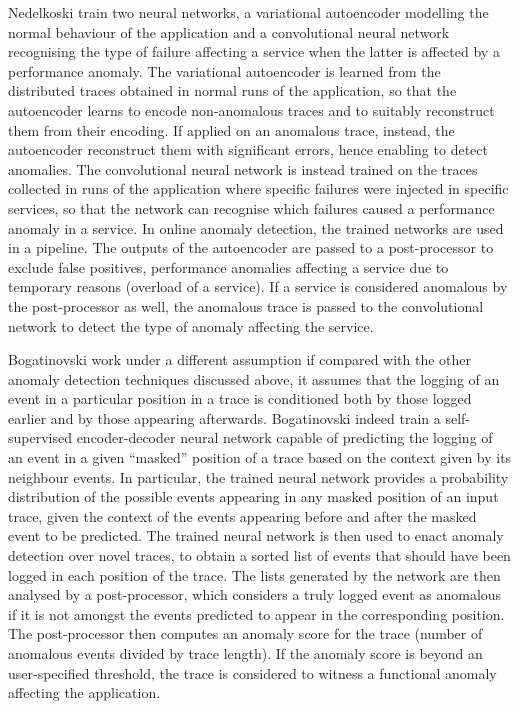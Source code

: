 Nedelkoski \etal \cite{34_Nedelkoski2019_AnomalyDetectionDistributedTracing} train two neural networks, \viz a variational autoencoder \cite{Kingma2015_VariationalAutoencoder} modelling the normal behaviour of the application and a convolutional neural network \cite{Goodfellow2016_DeepLearningBook} recognising the type of failure affecting a service when the latter is affected by a performance anomaly. 
The variational autoencoder is learned from the distributed traces obtained in normal runs of the application, so that the autoencoder learns to encode non-anomalous traces and to suitably reconstruct them from their encoding.
If applied on an anomalous trace, instead, the autoencoder reconstruct them with significant errors, hence enabling to detect anomalies.
The convolutional neural network is instead trained on the traces collected in runs of the application where specific failures were injected in specific services, so that the network can recognise which failures caused a performance anomaly in a service.
In online anomaly detection, the trained networks are used in a pipeline.
The outputs of the autoencoder are passed to a post-processor to exclude false positives, \viz performance anomalies affecting a service due to temporary reasons (\eg overload of a service). 
If a service is considered anomalous by the post-processor as well, the anomalous trace is passed to the convolutional network to detect the type of anomaly affecting the service. 

Bogatinovski \etal \cite{36_Bogatinovski2020_SelfSupervisedAnomalyDetection} work under a different assumption if compared with the other anomaly detection techniques discussed above, \viz it assumes that the logging of an event in a particular position in a trace is conditioned both by those logged earlier and by those appearing afterwards.
Bogatinovski \etal \cite{36_Bogatinovski2020_SelfSupervisedAnomalyDetection} indeed train a self-supervised encoder-decoder neural network \cite{Goodfellow2016_DeepLearningBook} capable of predicting the logging of an event in a given \enquote{masked} position of a trace based on the context given by its neighbour events. 
In particular, the trained neural network provides a probability distribution of the possible events appearing in any masked position of an input trace, given the context of the events appearing before and after the masked event to be predicted. 
The trained neural network is then used to enact anomaly detection over novel traces, \viz to obtain a sorted list of events that should have been logged in each position of the trace. 
The lists generated by the network are then analysed by a post-processor, which considers a truly logged event as anomalous if it is not amongst the events predicted to appear in the corresponding position. 
The post-processor then computes an anomaly score for the trace (\viz number of anomalous events divided by trace length).
If the anomaly score is beyond an user-specified threshold, the trace is considered to witness a functional anomaly affecting the application.

